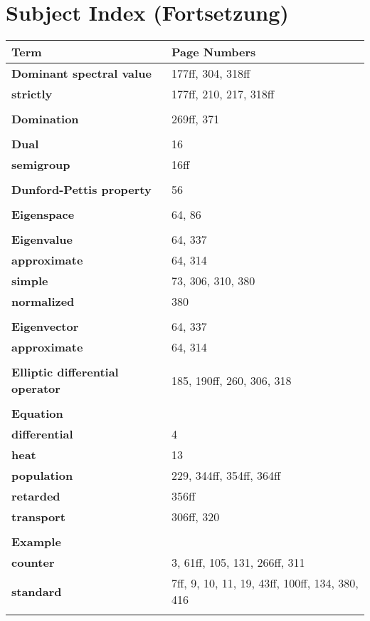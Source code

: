 \documentclass[10pt]{scrartcl}
\begin{document}
\section*{Subject Index (Fortsetzung)}

\begin{longtable}{>{\bfseries}p{6cm}p{8cm}}
\textbf{Term} & \textbf{Page Numbers} \\
\hline
\endhead

\textbf{Dominant spectral value} & 177ff, 304, 318ff \\
\quad strictly & 177ff, 210, 217, 318ff \\
\\
\textbf{Domination} & 269ff, 371 \\
\\
\textbf{Dual} & 16 \\
\quad semigroup & 16ff \\
\\
\textbf{Dunford-Pettis property} & 56 \\
\\
\textbf{Eigenspace} & 64, 86 \\
\\
\textbf{Eigenvalue} & 64, 337 \\
\quad approximate & 64, 314 \\
\quad simple & 73, 306, 310, 380 \\
\quad normalized & 380 \\
\\
\textbf{Eigenvector} & 64, 337 \\
\quad approximate & 64, 314 \\
\\
\textbf{Elliptic differential operator} & 185, 190ff, 260, 306, 318 \\
\\
\textbf{Equation} & \\
\quad differential & 4 \\
\quad heat & 13 \\
\quad population & 229, 344ff, 354ff, 364ff \\
\quad retarded & 356ff \\
\quad transport & 306ff, 320 \\
\\
\textbf{Example} & \\
\quad counter & 3, 61ff, 105, 131, 266ff, 311 \\
\quad standard & 7ff, 9, 10, 11, 19, 43ff, 100ff, 134, 380, 416 \\
\\

\end{longtable}
\end{document}
